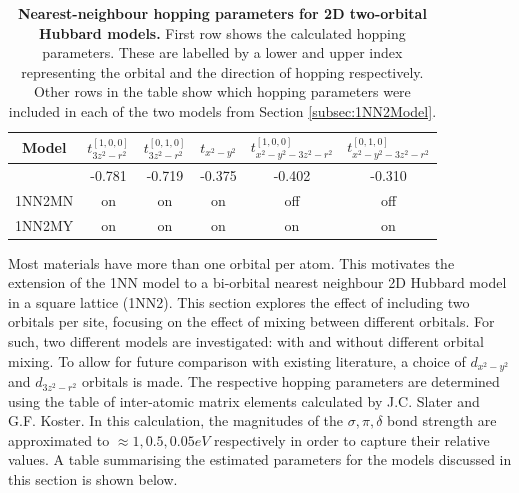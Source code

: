 \documentclass[11pt]{article}
\begin{document}
\begin{table}[h]
    \centering
    \begin{tabular}{|c|c|c|c|c|c|}
        \hline
       Model &$t^{[1,0,0]}_{3z^2-r^2}$  &$t^{[0,1,0]}_{3z^2-r^2}$  &  $t_{x^2 - y^2}$ &  $t^{[1,0,0]}_{x^2 - y^2 -3z^2-r^2} $ & $t^{[0,1,0]}_{x^2 - y^2 -3z^2-r^2} $ \\
        \hline
        & -0.781 & -0.719  &  -0.375 & -0.402 & -0.310\\
        \hline
        1NN2MN & on &  on  & on  & off & off  \\
        \hline
        1NN2MY & on &  on  & on  & on & on \\
          
        \hline
    \end{tabular}
    \caption{\textbf{Nearest-neighbour hopping parameters for 2D  two-orbital Hubbard models.} First row shows the calculated hopping parameters.
    These are labelled by a lower and upper index representing the orbital and the direction of hopping respectively.
    Other rows in the table show which hopping parameters were included in each of the two models from Section \ref{subsec:1NN2Model}.}
    \label{tab:2D2orbparams }
\end{table}


\noindent Most materials have more than one orbital per atom. This motivates the extension of the 
1NN model to a  bi-orbital nearest neighbour 2D Hubbard model in a square lattice (1NN2). This section explores the effect
of including two orbitals per site, focusing on the effect of mixing between different orbitals. For such, two different models are 
investigated: with and without different orbital mixing. To allow for future comparison with
existing literature\cite{sakakibara2024possible}, a choice of $d_{x^2-y^2}$ and $d_{3z^2 -r^2}$ orbitals is made. 
The respective hopping parameters are determined using the  table of inter-atomic matrix elements calculated by J.C. Slater and G.F. Koster\cite{slater1954simplified}. 
In this calculation, the magnitudes of the $\sigma,  \pi, \delta$ bond strength  are approximated to  $\approx  1, 0.5, 0.05eV$ respectively in order to capture their relative values\cite{blanksby2003bond, mcgrady2015introduction, krapp2008strength}.
A table summarising the estimated parameters for the models discussed in this section is shown below.\par

\medskip
\end{document}
